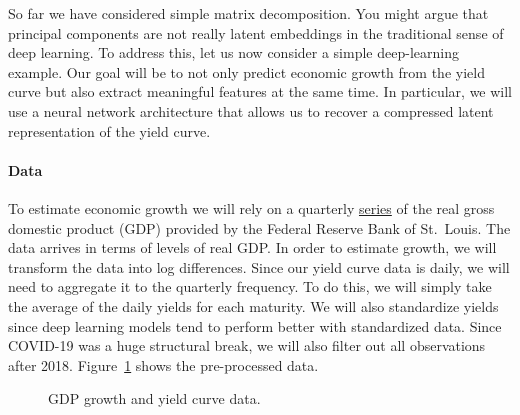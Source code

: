 \documentclass[
  letterpaper,
  DIV=11,
  numbers=noendperiod]{scrartcl}
\let\oldparagraph\paragraph
\renewcommand{\paragraph}[1]{\oldparagraph{#1}\mbox{}}
\theoremstyle{plain}
\theoremstyle{remark}
\begin{document}
So far we have considered simple matrix decomposition. You might argue
that principal components are not really latent embeddings in the
traditional sense of deep learning. To address this, let us now consider
a simple deep-learning example. Our goal will be to not only predict
economic growth from the yield curve but also extract meaningful
features at the same time. In particular, we will use a neural network
architecture that allows us to recover a compressed latent
representation of the yield curve.

\paragraph{Data}\label{data}

To estimate economic growth we will rely on a quarterly
\href{https://fred.stlouisfed.org/series/GDPC1}{series} of the real
gross domestic product (GDP) provided by the Federal Reserve Bank of
St.~Louis. The data arrives in terms of levels of real GDP. In order to
estimate growth, we will transform the data into log differences. Since
our yield curve data is daily, we will need to aggregate it to the
quarterly frequency. To do this, we will simply take the average of the
daily yields for each maturity. We will also standardize yields since
deep learning models tend to perform better with standardized data.
Since COVID-19 was a huge structural break, we will also filter out all
observations after 2018. Figure~\ref{fig-dl-data} shows the
pre-processed data.

\begin{figure}


\caption{\label{fig-dl-data}GDP growth and yield curve data.}

\end{figure}%
\end{document}
